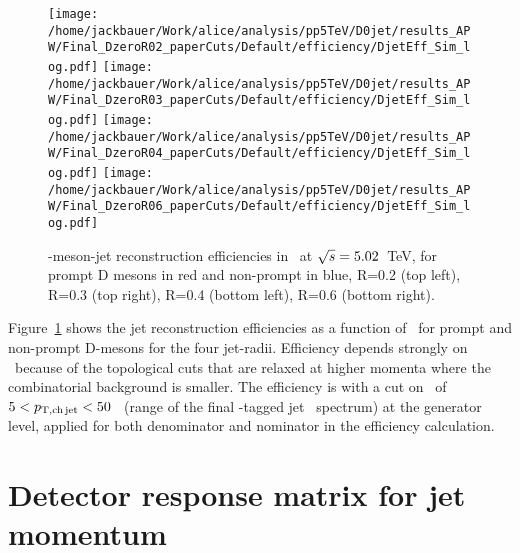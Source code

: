 \begin{figure}[bth]
\centering
\texttt{[image: /home/jackbauer/Work/alice/analysis/pp5TeV/D0jet/results\_APW/Final\_DzeroR02\_paperCuts/Default/efficiency/DjetEff\_Sim\_log.pdf]}
\texttt{[image: /home/jackbauer/Work/alice/analysis/pp5TeV/D0jet/results\_APW/Final\_DzeroR03\_paperCuts/Default/efficiency/DjetEff\_Sim\_log.pdf]}
\texttt{[image: /home/jackbauer/Work/alice/analysis/pp5TeV/D0jet/results\_APW/Final\_DzeroR04\_paperCuts/Default/efficiency/DjetEff\_Sim\_log.pdf]}
\texttt{[image: /home/jackbauer/Work/alice/analysis/pp5TeV/D0jet/results\_APW/Final\_DzeroR06\_paperCuts/Default/efficiency/DjetEff\_Sim\_log.pdf]}
    \caption{\Dzero-meson-jet reconstruction efficiencies in \pp\ at $\sqrt{s}=5.02$~TeV, for prompt D mesons in red and non-prompt in blue, R=0.2 (top left), R=0.3 (top right), R=0.4 (bottom left), R=0.6 (bottom right).}
\label{fig:eq_pp_DrecEff}
\end{figure}

Figure~\ref{fig:eq_pp_DrecEff} shows the \Dzero\-jet reconstruction efficiencies as a function of \ptd\, 
for prompt and non-prompt D-mesons for the four jet-radii. 
Efficiency depends strongly on \ptd\ because of the topological cuts that are relaxed at higher momenta where the combinatorial background is smaller. 
The efficiency is with a cut on \ptchjet\ of $5 < p_{\mathrm{T,ch\, jet}} < 50$ \GeVc\ (range of the final \Dzero-tagged jet \pt\ spectrum) at the generator level, applied for both denominator and nominator in the efficiency calculation.


\FloatBarrier
\section{ Detector response matrix for jet momentum}

